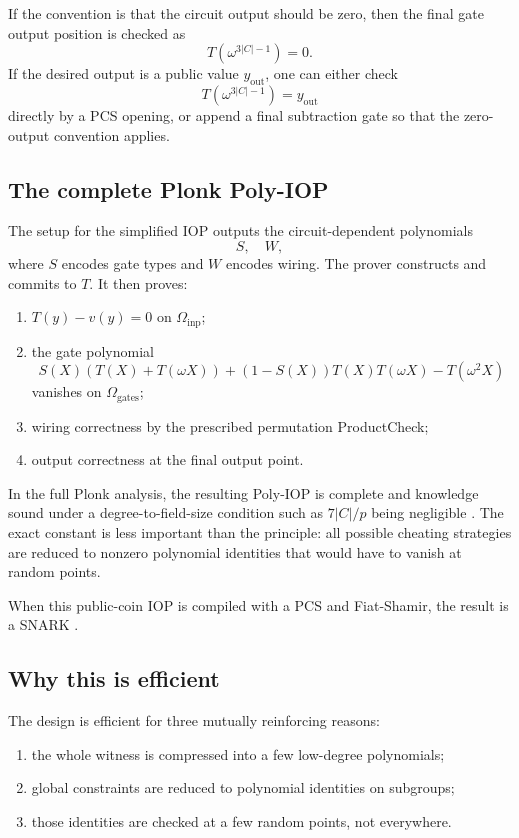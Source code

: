 If the convention is that the circuit output should be zero, then the final gate output position is checked as
\[
    T(\omega^{3|C|-1})=0.
\]
If the desired output is a public value $y_{\mathrm{out}}$, one can either check
\[
    T(\omega^{3|C|-1})=y_{\mathrm{out}}
\]
directly by a PCS opening, or append a final subtraction gate so that the zero-output convention applies.

\subsection{The complete Plonk Poly-IOP}

The setup for the simplified IOP outputs the circuit-dependent polynomials
\[
    S,\quad W,
\]
where $S$ encodes gate types and $W$ encodes wiring. The prover constructs and commits to $T$. It then proves:
\begin{enumerate}[leftmargin=2em]
    \item $T(y)-v(y)=0$ on $\Omega_{\mathrm{inp}}$;
    \item the gate polynomial
    \[
    S(X)(T(X)+T(\omega X))+(1-S(X))T(X)T(\omega X)-T(\omega^2X)
    \]
    vanishes on $\Omega_{\mathrm{gates}}$;
    \item wiring correctness by the prescribed permutation ProductCheck;
    \item output correctness at the final output point.
\end{enumerate}

In the full Plonk analysis, the resulting Poly-IOP is complete and knowledge sound under a degree-to-field-size condition such as $7|C|/p$ being negligible \cite{GabizonWilliamsonCiobotaru2019}. The exact constant is less important than the principle: all possible cheating strategies are reduced to nonzero polynomial identities that would have to vanish at random points.

When this public-coin IOP is compiled with a PCS and Fiat-Shamir, the result is a SNARK \cite{FiatShamir1986}.

\subsection{Why this is efficient}

The design is efficient for three mutually reinforcing reasons:
\begin{enumerate}[leftmargin=2em]
    \item the whole witness is compressed into a few low-degree polynomials;
    \item global constraints are reduced to polynomial identities on subgroups;
    \item those identities are checked at a few random points, not everywhere.
\end{enumerate}

